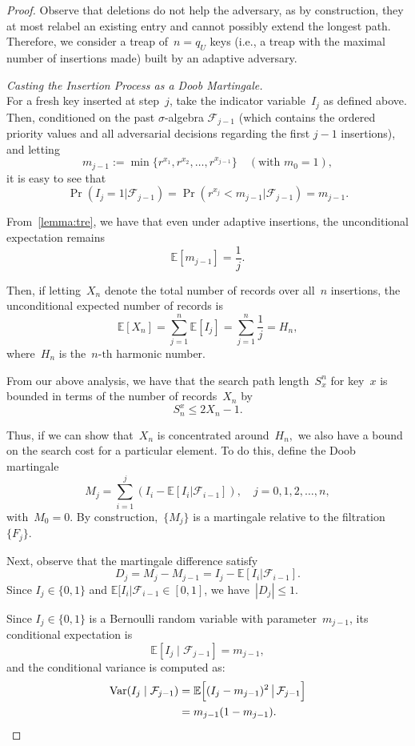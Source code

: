 \begin{proof}
Observe that deletions do not help the adversary, as by construction, they at most relabel an existing entry and cannot possibly extend the longest path. Therefore, we consider a treap of~$n=q_U$ keys (i.e., a treap with the maximal number of insertions made) built by an adaptive adversary.  

\textit{Casting the Insertion Process as a Doob Martingale.}\\
For a fresh key inserted at step~$j$, take the indicator variable~$I_j$ as defined above. Then, conditioned on the past $\sigma$-algebra $\mathcal{F}_{j-1}$ (which contains the ordered priority values and all adversarial decisions regarding the first $j-1$ insertions), and letting
$$m_{j-1} := \min\{r^{x_1}, r^{x_2}, \ldots, r^{x_{j-1}}\} \quad (\text{with } m_0 = 1),$$
it is easy to see that
$$\Pr(I_j = 1 | \mathcal{F}_{j-1}) = \Pr(r^{x_{j}} < m_{j-1} | \mathcal{F}_{j-1}) = m_{j-1}.$$

From~\cref{lemma:tre}, we have that even under adaptive insertions, the unconditional expectation remains
$$\mathbb{E}[m_{j-1}] = \frac{1}{j}.$$

Then, if letting~$X_n$ denote the total number of records over all~$n$ insertions, the unconditional expected number of records is
$$\mathbb{E}[X_n] = \sum_{j=1}^{n} \mathbb{E}[I_j] =  \sum_{j=1}^{n} \frac{1}{j} = H_n,$$
where~$H_n$ is the~$n\text{-th}$ harmonic number. 

From our above analysis, we have that the search path length~$S^{n}_x$ for key~$x$ is bounded in terms of the number of records~$X_n$ by
$$S_{n}^x \leq 2X_n -1.$$ 

Thus, if we can show that~$X_n$ is concentrated around~$H_n,$ we also have a bound on the search cost for a particular element. To do this, define the Doob martingale
$$M_j = \sum_{i=1}^{j} (I_i - \mathbb{E}[I_i | \mathcal{F}_{i-1}]), \quad j=0,1,2,\ldots,n,$$
with~$M_0=0.$ By construction,~$\{M_j\}$ is a martingale relative to the filtration~$\{F_j\}$. 

Next, observe that the martingale difference satisfy
$$D_j = M_j - M_{j-1} = I_j - \mathbb{E}[I_i | \mathcal{F}_{i-1}].$$
Since $I_j \in \{0,1\}$ and $\mathbb{E}[I_i | \mathcal{F}_{i-1} \in [0,1]$, we have~$|D_j| \leq 1$. 

Since $I_j\in\{0,1\}$ is a Bernoulli random variable with parameter~$m_{j-1}$, its conditional expectation is
$$
\mathbb{E}[I_j\mid \mathcal{F}_{j-1}] = m_{j-1},
$$
and the conditional variance is computed as:
\begin{align*}
\mathrm{Var}(I_j\mid \mathcal{F}_{j-1}) &= \mathbb{E}\Bigl[(I_j - m_{j-1})^2 \,\big|\, \mathcal{F}_{j-1}\Bigr] \\
&= m_{j-1}(1-m_{j-1}).
\end{align*}


\end{proof}
